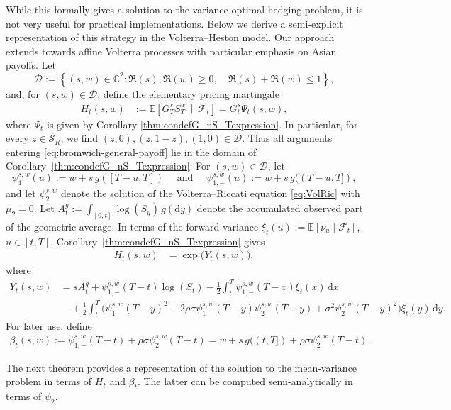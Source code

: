 \documentclass[10pt,a4paper,reqno]{amsart}
\theoremstyle{plain}
\theoremstyle{definition}
\theoremstyle{remark}
\theoremstyle{example}
\begin{document}
While this formally gives a solution to the variance-optimal hedging problem, it is not very useful for practical implementations. Below we derive a semi-explicit representation of this strategy in the Volterra--Heston model. Our approach extends \cite{DT2017, Kallsen2010} towards affine Volterra processes with particular emphasis on Asian payoffs. Let
\[
    \mathcal D := \left\{ (s,w)\in\mathbb C^2: \Re(s),\Re(w)\geq0,\quad \Re(s)+\Re(w)\leq1 \right\},
\]
and, for $(s,w)\in\mathcal D$, define the elementary pricing martingale
\begin{align}\label{eq:Hsw-hedging}
    H_t(s,w) &:= \mathbb E\left[ G_T^sS_T^w \,\middle|\, \mathcal F_t \right] = G_t^s\Psi_t(s,w),
\end{align}
where $\Psi_t$ is given by Corollary \ref{thm:condcfG_nS_Texpression}. In particular, for every $z\in\mathcal S_R$, we find $(z,0),(z,1-z), (1,0) \in\mathcal D$. Thus all arguments entering \eqref{eq:bromwich-general-payoff} lie in the domain of Corollary~\ref{thm:condcfG_nS_Texpression}. For $(s,w)\in\mathcal D$, let
\[
    \psi_1^{s,w}(u) := w+s\,g([T-u,T]) \quad \text{ and } \quad \psi_{1,-}^{s,w}(u) := w+s\,g((T-u,T]),
\]
and let $\psi_2^{s,w}$ denote the solution of the Volterra--Riccati equation \eqref{eq:VolRic} with $\mu_2 = 0$. Let $A_t^g := \int_{[0,t]}\log(S_y)\,g(\mathrm dy)$ denote the accumulated observed part of the geometric average. In terms of the forward variance $\xi_t(u) := \mathbb E[\nu_u\mid\mathcal F_t]$, $u\in[t,T]$, Corollary~\ref{thm:condcfG_nS_Texpression} gives
\begin{align}\label{eq:Y-general-hedge}
    H_t(s,w) &= \exp\bigl(Y_t(s,w)\bigr),
\end{align}
where
\begin{align}
    Y_t(s,w) &= sA_t^g + \psi_{1,-}^{s,w}(T-t)\log(S_t) \nonumber - \frac12 \int_t^T \psi_{1,-}^{s,w}(T-x) \xi_t(x)\, \mathrm dx 
    \\ &\quad + \frac12 \int_t^T \Big( \psi_1^{s,w}(T-y)^2 + 2\rho\sigma \psi_1^{s,w}(T-y) \psi_2^{s,w}(T-y) + \sigma^2 \psi_2^{s,w}(T-y)^2 \Big) \xi_t(y)\, \mathrm dy. \label{eq:Y-general-hedge-expanded}
\end{align}
For later use, define
\begin{align}\label{eq:beta-sw-hedge}
    \beta_t(s,w) := \psi_{1,-}^{s,w}(T-t) + \rho\sigma \psi_2^{s,w}(T-t) 
    = w+s\,g((t,T]) + \rho\sigma \psi_2^{s,w}(T-t).
\end{align}

The next theorem provides a representation of the solution to the mean-variance problem in terms of $H_t$ and $\beta_t$. The latter can be computed semi-analytically in terms of $\psi_2$. 
\end{document}
